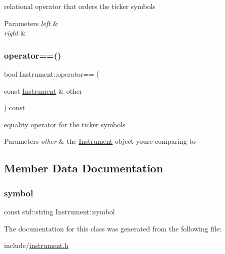 relational operator that orders the ticker symbols 


\begin{DoxyParams}{Parameters}
{\em left} & \\
\hline
{\em right} & \\
\hline
\end{DoxyParams}
\mbox{\label{classInstrument_a5fff991d72c20b0def886d743b6ae0b3}} 
\subsubsection{\texorpdfstring{operator==()}{operator==()}}
{\footnotesize\ttfamily bool Instrument\+::operator== (\begin{DoxyParamCaption}\item[{const \hyperlink{classInstrument}{Instrument} \&}]{other }\end{DoxyParamCaption}) const}



equality operator for the ticker symbols 


\begin{DoxyParams}{Parameters}
{\em other} & the \hyperlink{classInstrument}{Instrument} object you\textquotesingle{}re comparing to \\
\hline
\end{DoxyParams}


\subsection{Member Data Documentation}
\mbox{\label{classInstrument_a4c469c7cf9512a7b23eb1c26d94a0861}} 
\subsubsection{\texorpdfstring{symbol}{symbol}}
{\footnotesize\ttfamily const std\+::string Instrument\+::symbol}



The documentation for this class was generated from the following file\+:\begin{DoxyCompactItemize}
\item 
include/\hyperlink{instrument_8h}{instrument.\+h}\end{DoxyCompactItemize}
